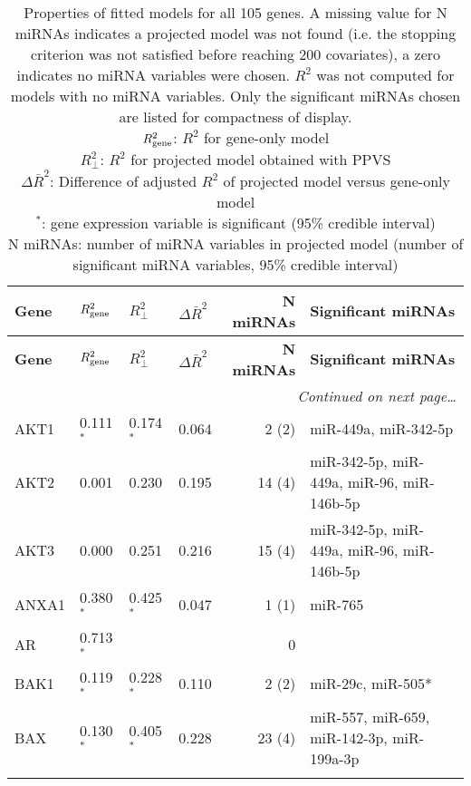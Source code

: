 { %
\tiny{\begin{longtable}{llllrp{7cm}}
\caption{
Properties of fitted models for all 105 genes. A missing value for N miRNAs indicates a projected model was not found
(i.e. the stopping criterion was not satisfied before reaching 200 covariates),
a zero indicates no miRNA variables were chosen.
$R^2$ was not computed for models with no miRNA variables.
Only the significant miRNAs chosen are listed for compactness of display. \\
$R^2_{\textup{gene}}$: $R^2$ for gene-only model \\
$R^2_\perp$: $R^2$ for projected model obtained with PPVS \\
$\Delta\bar{R}^2$: Difference of adjusted $R^2$ of projected model versus gene-only model \\
$^{\ast}$: gene expression variable is significant (95\% credible interval) \\
N miRNAs: number of miRNA variables in projected model (number of significant miRNA variables, 95\% credible interval) 
\label{table:final-models}
}
\label{table:finalModelTable}\\\hline
\textbf{Gene} & \textbf{$R^2_{\textup{gene}}$} & \textbf{$R^2_\perp$} & \textbf{$\Delta\bar{R}^2$} & \textbf{N miRNAs} & \textbf{Significant miRNAs}\\\hline
\endfirsthead{}%
\textbf{Gene} & \textbf{$R^2_{\textup{gene}}$} & \textbf{$R^2_\perp$} & \textbf{$\Delta\bar{R}^2$} & \textbf{N miRNAs} & \textbf{Significant miRNAs}\\\hline
\endhead\hline\multicolumn{6}{r}{\textit{Continued on next page\ldots\/}}
\endfoot\hline\endlastfoot{}%
ACACA&0.462$^{\ast}$&0.524$^{\ast}$&0.062&2 (2)&\raggedright{miR-30a, miR-370} \tabularnewline\rowcolor[rgb]{0.96,0.96,0.96}{}%
AKT1&0.111$^{\ast}$&0.174$^{\ast}$&0.064&2 (2)&\raggedright{miR-449a, miR-342-5p} \tabularnewline{}%
AKT2&0.001&0.230&0.195&14 (4)&\raggedright{miR-342-5p, miR-449a, miR-96, miR-146b-5p} \tabularnewline\rowcolor[rgb]{0.96,0.96,0.96}{}%
AKT3&0.000&0.251&0.216&15 (4)&\raggedright{miR-342-5p, miR-449a, miR-96, miR-146b-5p} \tabularnewline{}%
ANXA1&0.380$^{\ast}$&0.425$^{\ast}$&0.047&1 (1)&\raggedright{miR-765} \tabularnewline\rowcolor[rgb]{0.96,0.96,0.96}{}%
AR&0.713$^{\ast}$&&&0&\raggedright{} \tabularnewline{}%
BAK1&0.119$^{\ast}$&0.228$^{\ast}$&0.110&2 (2)&\raggedright{miR-29c, miR-505*} \tabularnewline\rowcolor[rgb]{0.96,0.96,0.96}{}%
BAX&0.130$^{\ast}$&0.405$^{\ast}$&0.228&23 (4)&\raggedright{miR-557, miR-659, miR-142-3p, miR-199a-3p} \tabularnewline{}%

\end{longtable}}}
